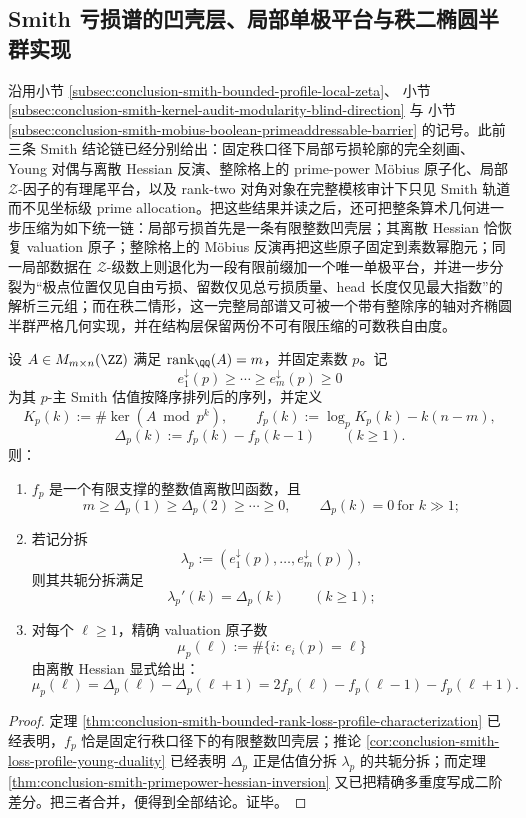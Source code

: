 \subsection{Smith 亏损谱的凹壳层、局部单极平台与秩二椭圆半群实现}\label{subsec:conclusion-smith-concavity-localzeta-ellipse-semigroup}

沿用小节 \ref{subsec:conclusion-smith-bounded-profile-local-zeta}、
小节 \ref{subsec:conclusion-smith-kernel-audit-modularity-blind-direction} 与
小节 \ref{subsec:conclusion-smith-mobius-boolean-primeaddressable-barrier}
的记号。此前三条 Smith 结论链已经分别给出：固定秩口径下局部亏损轮廓的完全刻画、Young 对偶与离散 Hessian 反演、整除格上的 prime-power Möbius 原子化、局部 \(\mathcal Z\)-因子的有理尾平台，以及 rank-two 对角对象在完整模核审计下只见 Smith 轨道而不见坐标级 prime allocation。把这些结果并读之后，还可把整条算术几何进一步压缩为如下统一链：局部亏损首先是一条有限整数凹壳层；其离散 Hessian 恰恢复 valuation 原子；整除格上的 Möbius 反演再把这些原子固定到素数幂胞元；同一局部数据在 \(\mathcal Z\)-级数上则退化为一段有限前缀加一个唯一单极平台，并进一步分裂为“极点位置仅见自由亏损、留数仅见总亏损质量、head 长度仅见最大指数”的解析三元组；而在秩二情形，这一完整局部谱又可被一个带有整除序的轴对齐椭圆半群严格几何实现，并在结构层保留两份不可有限压缩的可数秩自由度。

\begin{theorem}\label{thm:conclusion-smith-local-profile-young-hessian-unification}
设 \(A\in M_{m\times n}(\ZZ)\) 满足 \(\operatorname{rank}_{\QQ}(A)=m\)，并固定素数 \(p\)。记
\[
e_1^\downarrow(p)\ge \cdots \ge e_m^\downarrow(p)\ge 0
\]
为其 \(p\)-主 Smith 估值按降序排列后的序列，并定义
\[
K_p(k):=\#\ker(A\bmod p^k),
\qquad
f_p(k):=\log_p K_p(k)-k(n-m),
\]
\[
\Delta_p(k):=f_p(k)-f_p(k-1)
\qquad (k\ge 1).
\]
则：
\begin{enumerate}
  \item \(f_p\) 是一个有限支撑的整数值离散凹函数，且
  \[
  m\ge \Delta_p(1)\ge \Delta_p(2)\ge \cdots \ge 0,
  \qquad
  \Delta_p(k)=0\ \text{for }k\gg 1;
  \]
  \item 若记分拆
  \[
  \lambda_p:=(e_1^\downarrow(p),\dots,e_m^\downarrow(p)),
  \]
  则其共轭分拆满足
  \[
  \lambda_p'(k)=\Delta_p(k)
  \qquad (k\ge 1);
  \]
  \item 对每个 \(\ell\ge 1\)，精确 valuation 原子数
  \[
  \mu_p(\ell):=\#\{i:\ e_i(p)=\ell\}
  \]
  由离散 Hessian 显式给出：
  \[
  \mu_p(\ell)
  =
  \Delta_p(\ell)-\Delta_p(\ell+1)
  =
  2f_p(\ell)-f_p(\ell-1)-f_p(\ell+1).
  \]
\end{enumerate}
\end{theorem}
\begin{proof}
定理 \ref{thm:conclusion-smith-bounded-rank-loss-profile-characterization} 已经表明，\(f_p\) 恰是固定行秩口径下的有限整数凹壳层；推论 \ref{cor:conclusion-smith-loss-profile-young-duality} 已经表明 \(\Delta_p\) 正是估值分拆 \(\lambda_p\) 的共轭分拆；而定理 \ref{thm:conclusion-smith-primepower-hessian-inversion} 又已把精确多重度写成二阶差分。把三者合并，便得到全部结论。证毕。
\end{proof}

